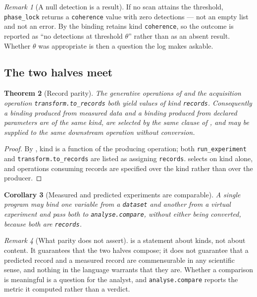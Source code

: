 \documentclass[11pt,twocolumn,a4paper]{article}
\theoremstyle{ssthm}
\newtheorem{theorem}{Theorem}[section]
\newtheorem{corollary}[theorem]{Corollary}
\theoremstyle{definition}
\theoremstyle{remark}
\newtheorem{remark}[theorem]{Remark}
\newcommand{\shk}[1]{\texttt{#1}}
\begin{document}
\begin{remark}[A null detection is a result]
\label{rem:null-detection}
If no scan attains the threshold, \shk{phase\_lock} returns a
\shk{coherence} value with zero detections --- not an empty list and not
an error. By  the binding retains kind
\shk{coherence}, so the outcome is reported as ``no detections at
threshold $\theta$'' rather than as an absent result. Whether $\theta$
was appropriate is then a question the log makes askable.
\end{remark}

\subsection{The two halves meet}

\begin{theorem}[Record parity]
\label{thm:record-parity}
The generative operations of  and the acquisition
operation \shk{transform.to\_records} both yield values of kind
\shk{records}. Consequently a binding produced from measured data and a
binding produced from declared parameters are of the same kind, are
selected by the same clause of , and may be supplied to
the same downstream operation without conversion.
\end{theorem}

\begin{proof}
By , kind is a function of the producing operation;
both \shk{run\_experiment} and \shk{transform.to\_records} are listed as
assigning \shk{records}.  selects on kind alone, and
operations consuming records are specified over the kind rather than over
the producer.
\end{proof}

\begin{corollary}[Measured and predicted experiments are comparable]
\label{cor:comparable}
A single program may bind one variable from a \shk{dataset} and another
from a virtual experiment and pass both to \shk{analyse.compare}, without
either being converted, because both are \shk{records}.
\end{corollary}

\begin{remark}[What parity does not assert]
\label{rem:parity-limits}
 is a statement about kinds, not about content.
It guarantees that the two halves compose; it does not guarantee that a
predicted record and a measured record are commensurable in any
scientific sense, and nothing in the language warrants that they are.
Whether a comparison is meaningful is a question for the analyst, and
\shk{analyse.compare} reports the metric it computed rather than a
verdict.
\end{remark}
\end{document}
